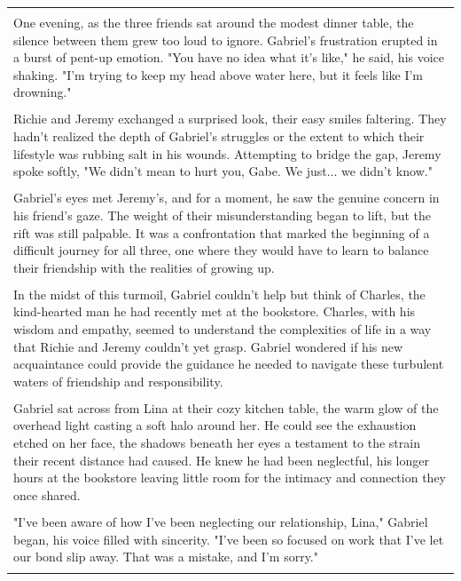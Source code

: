 \begin{small}
\begin{longtable}{p{}}
\\
\\
One evening, as the three friends sat around the modest dinner table, the silence between them grew too loud to ignore. Gabriel's frustration erupted in a burst of pent-up emotion. "You have no idea what it's like," he said, his voice shaking. "I'm trying to keep my head above water here, but it feels like I'm drowning."
\\
\\
Richie and Jeremy exchanged a surprised look, their easy smiles faltering. They hadn't realized the depth of Gabriel's struggles or the extent to which their lifestyle was rubbing salt in his wounds. Attempting to bridge the gap, Jeremy spoke softly, "We didn't mean to hurt you, Gabe. We just... we didn't know."
\\
\\
Gabriel's eyes met Jeremy's, and for a moment, he saw the genuine concern in his friend's gaze. The weight of their misunderstanding began to lift, but the rift was still palpable. It was a confrontation that marked the beginning of a difficult journey for all three, one where they would have to learn to balance their friendship with the realities of growing up.
\\
\\
In the midst of this turmoil, Gabriel couldn't help but think of Charles, the kind-hearted man he had recently met at the bookstore. Charles, with his wisdom and empathy, seemed to understand the complexities of life in a way that Richie and Jeremy couldn't yet grasp. Gabriel wondered if his new acquaintance could provide the guidance he needed to navigate these turbulent waters of friendship and responsibility.
\\
\\
Gabriel sat across from Lina at their cozy kitchen table, the warm glow of the overhead light casting a soft halo around her. He could see the exhaustion etched on her face, the shadows beneath her eyes a testament to the strain their recent distance had caused. He knew he had been neglectful, his longer hours at the bookstore leaving little room for the intimacy and connection they once shared.
\\
\\
"I've been aware of how I've been neglecting our relationship, Lina," Gabriel began, his voice filled with sincerity. "I've been so focused on work that I've let our bond slip away. That was a mistake, and I'm sorry."
\\
\\

\end{longtable}
\end{small}
